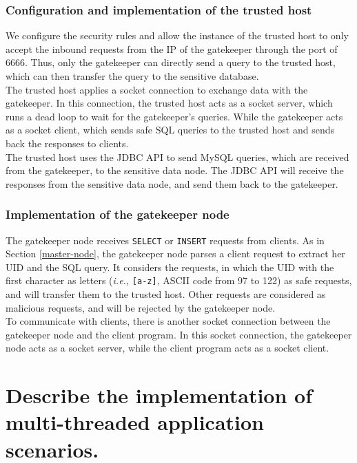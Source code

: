 \documentclass{article}
\begin{document}
\subsubsection{Configuration and implementation of the trusted host}
We configure the security rules and allow the instance of the trusted host to only accept the inbound requests from the IP of the gatekeeper through the port of 6666. Thus, only the gatekeeper can directly send a query to the trusted host, which can then transfer the query to the sensitive database.\\

The trusted host applies a socket connection to exchange data with the gatekeeper. In this connection, the trusted host acts as a socket server, which runs a dead loop to wait for the gatekeeper's queries. While the gatekeeper acts as a socket client, which sends safe SQL queries to the trusted host and sends back the responses to clients.\\

The trusted host uses the JDBC API to send MySQL queries, which are received from the gatekeeper, to the sensitive data node. The JDBC API will receive the responses from the sensitive data node, and send them back to the gatekeeper.

\subsubsection{Implementation of the gatekeeper node}
The gatekeeper node receives \texttt{SELECT} or \texttt{INSERT} requests from clients. As in Section \ref{master-node}, the gatekeeper node parses a client request to extract her UID and the SQL query. It considers the requests, in which the UID with the first character as letters (\emph{i.e.,} \texttt{[a-z]}, ASCII code from 97 to 122) as safe requests, and will transfer them to the trusted host. Other requests are considered as malicious requests, and will be rejected by the gatekeeper node. \\

To communicate with clients, there is another socket connection between the gatekeeper node and the client program. In this socket connection, the gatekeeper node acts as a socket server, while the client program acts as a socket client.


\section{Describe the implementation of multi-threaded application scenarios.}\label{Q4}
\end{document}
